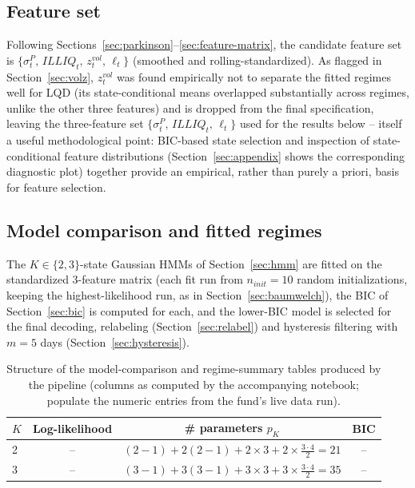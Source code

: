 \documentclass[11pt]{article}
\theoremstyle{definition}
\theoremstyle{remark}
\begin{document}
\subsection{Feature set}

Following Sections~\ref{sec:parkinson}--\ref{sec:feature-matrix}, the candidate feature set is $\{\sigma^P_t,\,ILLIQ_t,\,z^{vol}_t,\,\ell_t\}$ (smoothed and rolling-standardized). As flagged in Section~\ref{sec:volz}, $z^{vol}_t$ was found empirically not to separate the fitted regimes well for LQD (its state-conditional means overlapped substantially across regimes, unlike the other three features) and is dropped from the final specification, leaving the three-feature set $\{\sigma^P_t,\,ILLIQ_t,\,\ell_t\}$ used for the results below -- itself a useful methodological point: BIC-based state selection and inspection of state-conditional feature distributions (Section~\ref{sec:appendix} shows the corresponding diagnostic plot) together provide an empirical, rather than purely a priori, basis for feature selection.

\subsection{Model comparison and fitted regimes}

The $K\in\{2,3\}$-state Gaussian HMMs of Section~\ref{sec:hmm} are fitted on the standardized 3-feature matrix (each fit run from $n_{init}=10$ random initializations, keeping the highest-likelihood run, as in Section~\ref{sec:baumwelch}), the BIC of Section~\ref{sec:bic} is computed for each, and the lower-BIC model is selected for the final decoding, relabeling (Section~\ref{sec:relabel}) and hysteresis filtering with $m=5$ days (Section~\ref{sec:hysteresis}).

\begin{table}[H]
\centering
\caption{Structure of the model-comparison and regime-summary tables produced by the pipeline (columns as computed by the accompanying notebook; populate the numeric entries from the fund's live data run).}
\label{tab:results-template}
\begin{tabular}{lccc}
\toprule
$K$ & Log-likelihood & \# parameters $p_K$ & BIC \\
\midrule
2 & -- & $(2{-}1)+2(2{-}1)+2{\times}3+2{\times}\frac{3\cdot4}{2}=21$ & -- \\
3 & -- & $(3{-}1)+3(3{-}1)+3{\times}3+3{\times}\frac{3\cdot4}{2}=35$ & -- \\
\bottomrule
\end{tabular}
\end{table}
\end{document}
